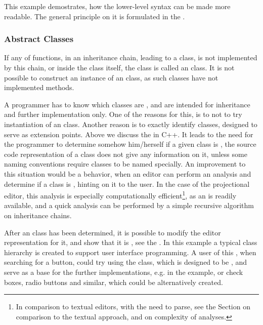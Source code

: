 This example demostrates, how the lower-level syntax can be made more readable. The general principle on it is formulated in
the .

\subsubsection{Abstract Classes}
\label{abstractclasses}

If any of   functions, in an inheritance chain, leading to a class, is not implemented by this chain, 
or inside the class itself, the class is called an  class. It is not possible to construct an instance of an
 class, as such classes have not implemented methods.

A programmer has to know which classes are ,
and are intended for inheritance and further implementation only. One of the reasons for this, is to not to try instantiation of
an  class. Another reason is to exactly identify  classes, designed to serve as extension points.
Above we discuss the  in C++. It leads to the need for the programmer to determine somehow him/herself 
if a given class is , the source code representation of a class does not give any information on it, 
unless some naming conventions require  classes to be named specially.
An improvement to this situation would be a behavior, when an editor can perform an analysis and 
determine if a class is , hinting on it to the user. In the case of the projectional
editor, this analysis is especially computationally efficient\footnote{In comparison to textual editors, with the need to 
parse, see the Section  on comparison to the textual approach, and  on complexity of analyses.}, 
as an  is readily available, and a quick  analysis can be performed by a simple recursive algorithm on inheritance chains.

After an  class has been determined, it is possible to modify the editor representation for it, 
and show that it is , see the .
In this example a typical class hierarchy is created to support user interface programming. A user of this , when 
searching for a button, could try using the  class, which is designed to be , and serve as a 
base for the further implementations, e.g.  in the example, or check boxes, radio buttons and similar,
which could be alternatively created.

